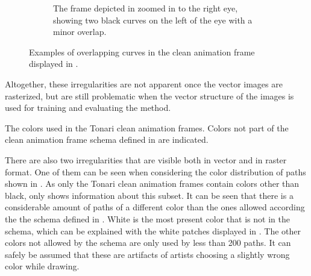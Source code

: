 \begin{figure}
\begin{subfigure}{.45\textwidth}
        \caption{The frame depicted in  zoomed in to the right eye, showing two black curves on the left of the eye with a minor overlap.}
        \label{fig:overlapping.short}
    \end{subfigure}
    \caption{Examples of overlapping curves in the clean animation frame displayed in .}
    \label{fig:overlapping}
\end{figure}

Altogether, these irregularities are not apparent once the vector images are rasterized, but are still problematic when the vector structure of the images is used for training and evaluating the method.

\begin{table}[]
    \centering
    
    \caption{The colors used in the Tonari clean animation frames. Colors not part of the clean animation frame schema defined in  are indicated.}
    \label{tab:stroke_color_counter}
\end{table}

There are also two irregularities that are visible both in vector and in raster format. One of them can be seen when considering the color distribution of paths shown in . As only the Tonari clean animation frames contain colors other than black,  only shows information about this subset. It can be seen that there is a considerable amount of paths of a different color than the ones allowed according the the schema defined in . White is the most present color that is not in the schema, which can be explained with the white patches displayed in . The other colors not allowed by the schema are only used by less than 200 paths. It can safely be assumed that these are artifacts of artists choosing a slightly wrong color while drawing.


